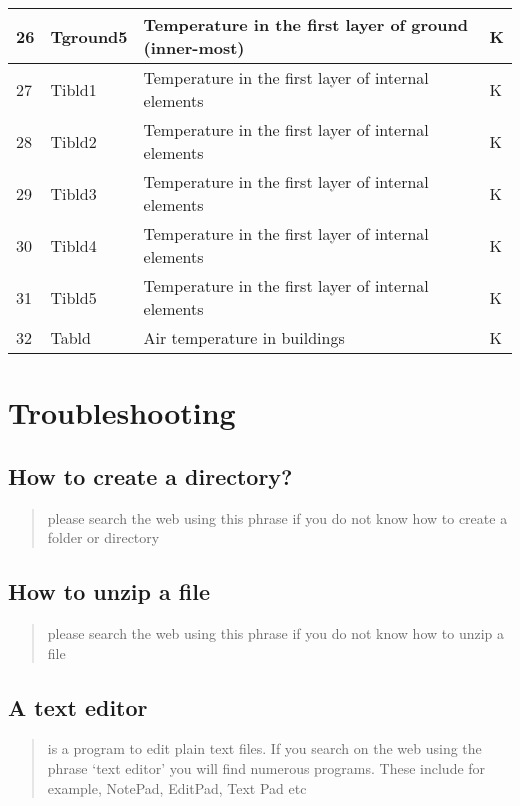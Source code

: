 \documentclass[letterpaper,10pt,english]{sphinxmanual}
\begin{document}
\begin{savenotes}
\begin{longtable}{|l|l|l|l|}
\hline
26
&
Tground5
&
Temperature in
the first layer
of ground
(inner-most)
&
K
\\
\hline
27
&
Tibld1
&
Temperature in
the first layer
of internal
elements
&
K
\\
\hline
28
&
Tibld2
&
Temperature in
the first layer
of internal
elements
&
K
\\
\hline
29
&
Tibld3
&
Temperature in
the first layer
of internal
elements
&
K
\\
\hline
30
&
Tibld4
&
Temperature in
the first layer
of internal
elements
&
K
\\
\hline
31
&
Tibld5
&
Temperature in
the first layer
of internal
elements
&
K
\\
\hline
32
&
Tabld
&
Air temperature
in buildings
&
K
\\
\hline
\end{longtable}\sphinxatlongtableend\end{savenotes}


\chapter{Troubleshooting}
\label{\detokenize{troubleshooting::doc}}\label{\detokenize{troubleshooting:troubleshooting}}

\section{How to create a directory?}
\label{\detokenize{troubleshooting:how-to-create-a-directory}}\begin{quote}

please search the web using this phrase if you do not know how to
create a folder or directory
\end{quote}


\section{How to unzip a file}
\label{\detokenize{troubleshooting:how-to-unzip-a-file}}\begin{quote}

please search the web using this phrase if you do not know how to
unzip a file
\end{quote}


\section{A text editor}
\label{\detokenize{troubleshooting:a-text-editor}}\begin{quote}

is a program to edit plain text files. If you search on the web
using the phrase ‘text editor’ you will find numerous programs.
These include for example, NotePad, EditPad, Text Pad etc
\end{quote}
\end{document}
